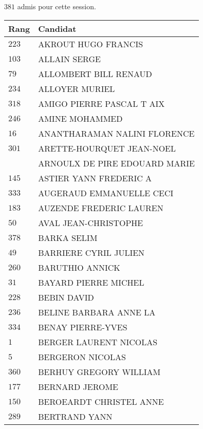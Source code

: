 




  $381$ admis pour cette session.

  \begin{xltabular}{\linewidth}{|l|X|}
    \hline
    \textbf{Rang} & \textbf{Candidat} \\
    \hline
    $223$ & AKROUT HUGO FRANCIS \\
    \hline
    $103$ & ALLAIN SERGE \\
    \hline
    $79$ & ALLOMBERT BILL RENAUD \\
    \hline
    $234$ & ALLOYER MURIEL \\
    \hline
    $318$ & AMIGO PIERRE PASCAL T AIX \\
    \hline
    $246$ & AMINE MOHAMMED \\
    \hline
    $16$ & ANANTHARAMAN NALINI FLORENCE \\
    \hline
    $301$ & ARETTE-HOURQUET JEAN-NOEL \\
    \hline
    & ARNOULX DE PIRE EDOUARD MARIE \\
    \hline
    $145$ & ASTIER YANN FREDERIC A \\
    \hline
    $333$ & AUGERAUD EMMANUELLE CECI \\
    \hline
    $183$ & AUZENDE FREDERIC LAUREN \\
    \hline
    $50$ & AVAL JEAN-CHRISTOPHE \\
    \hline
    $378$ & BARKA SELIM \\
    \hline
    $49$ & BARRIERE CYRIL JULIEN \\
    \hline
    $260$ & BARUTHIO ANNICK \\
    \hline
    $31$ & BAYARD PIERRE MICHEL \\
    \hline
    $228$ & BEBIN DAVID \\
    \hline
    $236$ & BELINE BARBARA ANNE LA \\
    \hline
    $334$ & BENAY PIERRE-YVES \\
    \hline
    $1$ & BERGER LAURENT NICOLAS \\
    \hline
    $5$ & BERGERON NICOLAS \\
    \hline
    $360$ & BERHUY GREGORY WILLIAM \\
    \hline
    $177$ & BERNARD JEROME \\
    \hline
    $150$ & BEROEARDT CHRISTEL ANNE \\
    \hline
    $289$ & BERTRAND YANN \\

\end{xltabular}
